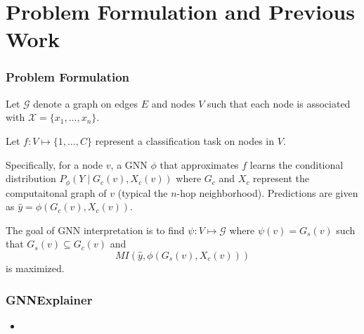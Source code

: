 \documentclass[11pt]{beamer}
\begin{document}
\section{Problem Formulation and Previous Work}
\begin{frame}
    \frametitle{Problem Formulation}

    Let $\mathcal{G}$ denote a graph on edges $E$ and nodes $V$ such that each node is associated with $\mathcal{X} = \{x_1, \dots, x_n\}$.

    \bigskip

    Let $f : V \mapsto \{1, \dots, C\}$ represent a classification task on nodes in $V$. 

    \bigskip
    
    Specifically, for a node $v$, a GNN $\phi$ that approximates $f$ learns the conditional distribution $P_{\phi}(Y \mid G_c(v), X_c(v))$ where $G_c$ and $X_c$ represent the computaitonal graph of $v$ (typical the $n$-hop neighborhood). Predictions are given as $\hat{y} = \phi(G_c(v), X_c(v))$.

    \bigskip

    The goal of GNN interpretation is to find $\psi : V \mapsto \mathcal{G}$ where $\psi(v) = G_s(v)$ such that $G_s(v) \subseteq G_c(v)$ and
    \[
        MI(\hat{y}, \phi(G_s(v), X_c(v))) 
    \]
    is maximized.
\end{frame}

\begin{frame}
    \frametitle{GNNExplainer}

    \begin{itemize}
        \item 
    \end{itemize}
\end{frame}
\end{document}

